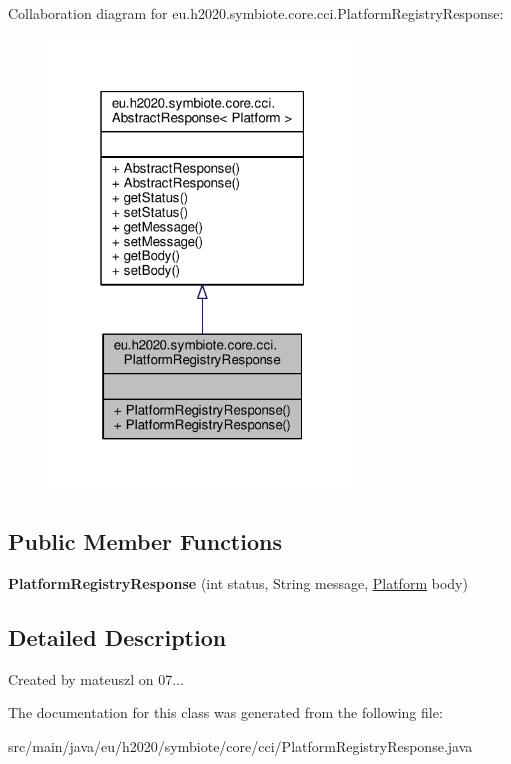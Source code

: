 Collaboration diagram for eu.\+h2020.\+symbiote.\+core.\+cci.\+Platform\+Registry\+Response\+:\nopagebreak
\begin{figure}[H]
\begin{center}
\leavevmode
\includegraphics[width=232pt]{classeu_1_1h2020_1_1symbiote_1_1core_1_1cci_1_1PlatformRegistryResponse__coll__graph}
\end{center}
\end{figure}
\subsection*{Public Member Functions}
\begin{DoxyCompactItemize}
\item 
\mbox{\label{classeu_1_1h2020_1_1symbiote_1_1core_1_1cci_1_1PlatformRegistryResponse_a624805ede42e5cba5d325fda1b3cc94f}} 
{\bfseries Platform\+Registry\+Response} (int status, String message, \hyperlink{classeu_1_1h2020_1_1symbiote_1_1model_1_1mim_1_1Platform}{Platform} body)
\end{DoxyCompactItemize}


\subsection{Detailed Description}
Created by mateuszl on 07... 

The documentation for this class was generated from the following file\+:\begin{DoxyCompactItemize}
\item 
src/main/java/eu/h2020/symbiote/core/cci/Platform\+Registry\+Response.\+java\end{DoxyCompactItemize}
